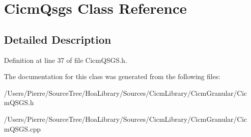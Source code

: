 \hypertarget{class_cicm_qsgs}{\section{Cicm\-Qsgs Class Reference}
\label{class_cicm_qsgs}
}


\subsection{Detailed Description}


Definition at line 37 of file Cicm\-Q\-S\-G\-S.\-h.



The documentation for this class was generated from the following files\-:\begin{DoxyCompactItemize}
\item 
/\-Users/\-Pierre/\-Source\-Tree/\-Hoa\-Library/\-Sources/\-Cicm\-Library/\-Cicm\-Granular/Cicm\-Q\-S\-G\-S.\-h\item 
/\-Users/\-Pierre/\-Source\-Tree/\-Hoa\-Library/\-Sources/\-Cicm\-Library/\-Cicm\-Granular/Cicm\-Q\-S\-G\-S.\-cpp\end{DoxyCompactItemize}
